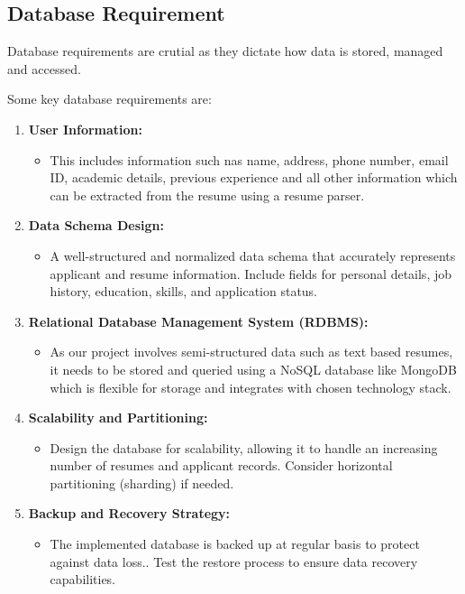 \subsection{Database Requirement}
Database requirements are crutial as they dictate how data is stored, managed and accessed. 

Some key database requirements are:
\begin{enumerate}
    \item \textbf{User Information:}
		\begin{itemize}
			\item This includes information such nas name, address, phone number, email ID, academic details, previous experience and all other information which can be extracted from the resume using a resume parser.
		\end{itemize}
    \item \textbf{Data Schema Design:}
		\begin{itemize}
			\item A well-structured and normalized data schema that accurately represents applicant and resume information. Include fields for personal details, job history, education, skills, and application status.
		\end{itemize}
    \item \textbf{Relational Database Management System (RDBMS):}
		\begin{itemize}
			\item As our project involves semi-structured data such as text based resumes, it needs to be stored and queried using a NoSQL database like MongoDB which is flexible for storage and integrates with chosen technology stack.
		\end{itemize}
    \item \textbf{Scalability and Partitioning:}
		\begin{itemize}
			\item Design the database for scalability, allowing it to handle an increasing number of resumes and applicant records. Consider horizontal partitioning (sharding) if needed.
		\end{itemize}
    \item \textbf{Backup and Recovery Strategy:}
		\begin{itemize}
			\item The implemented database is backed up at regular basis to protect against data loss.. Test the restore process to ensure data recovery capabilities.
		\end{itemize}

\end{enumerate}
